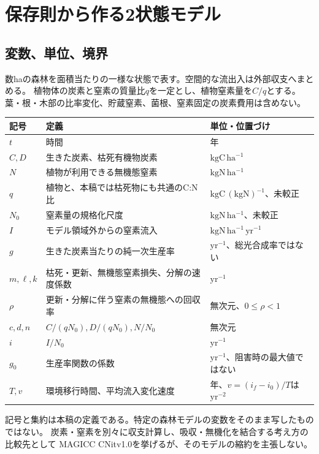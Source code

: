 \documentclass[a4paper,11pt]{ltjsarticle}
\begin{document}
\section{保存則から作る2状態モデル}
\subsection{変数、単位、境界}
数haの森林を面積当たりの一様な状態で表す。空間的な流出入は外部収支へまとめる。
植物体の炭素と窒素の質量比$q$を一定とし、植物窒素量を$C/q$とする。
葉・根・木部の比率変化、貯蔵窒素、菌根、窒素固定の炭素費用は含めない。

\begin{longtable}{p{.17\linewidth}p{.43\linewidth}p{.30\linewidth}}
\toprule 記号 & 定義 & 単位・位置づけ\\\midrule\endhead
$t$ & 時間 & 年\\
$C,D$ & 生きた炭素、枯死有機物炭素 & $\mathrm{kgC\,ha^{-1}}$\\
$N$ & 植物が利用できる無機態窒素 & $\mathrm{kgN\,ha^{-1}}$\\
$q$ & 植物と、本稿では枯死物にも共通のC:N比 & $\mathrm{kgC\,(kgN)^{-1}}$、未較正\\
$N_0$ & 窒素量の規格化尺度 & $\mathrm{kgN\,ha^{-1}}$、未較正\\
$I$ & モデル領域外からの窒素流入 & $\mathrm{kgN\,ha^{-1}\,yr^{-1}}$\\
$g$ & 生きた炭素当たりの純一次生産率 & $\mathrm{yr^{-1}}$、総光合成率ではない\\
$m,\ell,k$ & 枯死・更新、無機態窒素損失、分解の速度係数 & $\mathrm{yr^{-1}}$\\
$\rho$ & 更新・分解に伴う窒素の無機態への回収率 & 無次元、$0\leq\rho<1$\\
$c,d,n$ & $C/(qN_0),D/(qN_0),N/N_0$ & 無次元\\
$i$ & $I/N_0$ & $\mathrm{yr^{-1}}$\\
$g_0$ & 生産率関数の係数 & $\mathrm{yr^{-1}}$、阻害時の最大値ではない\\
$T,v$ & 環境移行時間、平均流入変化速度 & 年、$v=(i_f-i_0)/T$は$\mathrm{yr^{-2}}$\\
\bottomrule
\end{longtable}
記号と集約は本稿の定義である。特定の森林モデルの変数をそのまま写したものではない。
炭素・窒素を別々に収支計算し、吸収・無機化を結合する考え方の比較先として
MAGICC CNitv1.0\cite{tang}を挙げるが、そのモデルの縮約を主張しない。
\end{document}
